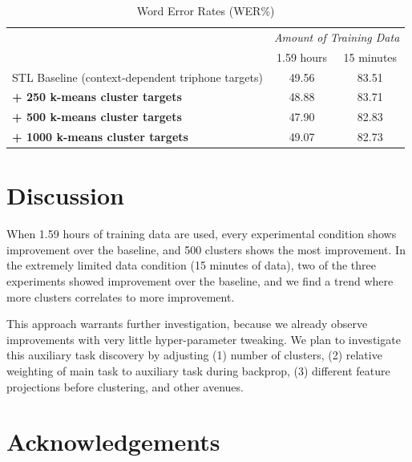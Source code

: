 \documentclass[a4paper]{article}
\begin{document}
\begin{table}[!htbp]
  \centering
  \caption{Word Error Rates (WER\%)}
    \label{tab:results}
  \begin{adjustbox}{width=.49\textwidth}
    \begin{tabular}{lcc}
      \toprule
      & \multicolumn{2}{c}{ \textit{Amount of Training Data}}\\
      & 1.59 hours & 15 minutes \\
      \midrule
      STL Baseline (context-dependent triphone targets)                            & 49.56       &  83.51 \\
      \textbf{+ 250 k-means cluster targets}        & 48.88            & 83.71 \\
      \textbf{+ 500 k-means cluster targets}        & 47.90       & 82.83 \\
      \textbf{+ 1000 k-means cluster targets}        & 49.07       & 82.73 \\
      \midrule
      \bottomrule
    \end{tabular}
  \end{adjustbox}
\end{table}




\section{Discussion}


When 1.59 hours of training data are used, every experimental condition shows improvement over the baseline, and 500 clusters shows the most improvement. In the extremely limited data condition (15 minutes of data), two of the three experiments showed improvement over the baseline, and we find a trend where more clusters correlates to more improvement.

This approach warrants further investigation, because we already observe improvements with very little hyper-parameter tweaking. We plan to investigate this auxiliary task discovery by adjusting (1) number of clusters, (2) relative weighting of main task to auxiliary task during backprop, (3) different feature projections before clustering, and other avenues.






\section{Acknowledgements}
\end{document}
